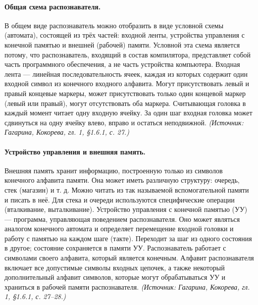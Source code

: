 \documentclass[a4paper,12pt]{article}
\begin{document}
\paragraph{Общая схема распознавателя.}
В общем виде распознаватель можно отобразить в виде условной схемы (автомата), состоящей из трёх частей: входной ленты, устройства управления с конечной памятью и внешней (рабочей) памяти. Условной эта схема является потому, что распознаватель, входящий в состав компилятора, представляет собой часть программного обеспечения, а не часть устройства компьютера. Входная лента — линейная последовательность ячеек, каждая из которых содержит один входной символ из конечного входного алфавита. Могут присутствовать левый и правый концевые маркеры, может присутствовать только один концевой маркер (левый или правый), могут отсутствовать оба маркера. Считывающая головка в каждый момент читает одну входную ячейку. За один шаг входная головка может сдвинуться на одну ячейку влево, вправо и остаться неподвижной.
\textit{(Источник: Гагарина, Кокорева, гл. 1, §1.6.1, с. 27.)}

\paragraph{Устройство управления и внешняя память.}
Внешняя память хранит информацию, построенную только из символов конечного алфавита памяти. Она может иметь различную структуру: очередь, стек (магазин) и т. д. Можно читать из так называемой вспомогательной памяти и писать в неё. Для стека и очереди используются специфические операции (вталкивание, выталкивание). Устройство управления с конечной памятью (УУ) — программа, управляющая поведением распознавателя. Оно может являться аналогом конечного автомата и определяет перемещение входной головки и работу с памятью на каждом шаге (такте). Переходит за шаг из одного состояния в другое; состояние сохраняется в памяти УУ. Распознаватель работает с символами своего алфавита, который является конечным. Алфавит распознавателя включает все допустимые символы входных цепочек, а также некоторый дополнительный алфавит символов, которые могут обрабатываться УУ и храниться в рабочей памяти распознавателя.
\textit{(Источник: Гагарина, Кокорева, гл. 1, §1.6.1, с. 27--28.)}
\end{document}
